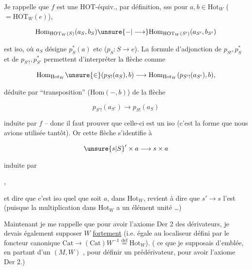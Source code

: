 Je rappelle que $f$ est une $\mathrm{HOT}$-équiv., par définition, sss pour  $a,b\in\mathrm{Hot}_W$ ($=\mathrm{HOT}_W(e)$),

\[
 \mathrm{Hom}_{\mathrm{HOT}_W(S)}(a_S,b_S)\unsure{\mathord{-}|\longrightarrow}
 \mathrm{Hom}_{\mathrm{HOT}_W(S')}(a_{S'},b_{S'})
\]

est iso, où $a_S$  désigne $p_S^*(a)$ etc ($p_S:S\longrightarrow e$). La formule d'adjonction de $p_{S!},p_S^*$ et de $p_{S'!},p_{S'}^*$ permettent d'interpréter la flèche  comme

\[
 \mathrm{Hom}_{\mathrm{Hot}_W}\unsure{\in}(p_{S!}(a_S),b)\longrightarrow
 \mathrm{Hom}_{\mathrm{Hot}_W}(p_{S'!}(a_{S'}),b),
\]


déduite par ``transposition'' ($\mathrm{Hom}(-,b)$) de la flèche

\[
 p_{S'!}(a_{S'})\longrightarrow p_{S!}(a_S)
\]

induite par $f$ -- donc il faut prouver que celle-ci est un iso (c'est la forme que nous avions utilisée tantôt). Or cette flèche s'identifie à

\[
 \unsure{s|S}'\times a\longrightarrow s\times a
\]

induite par


,

et dire que c'est iso quel que soit $a$, dans $\mathrm{Hot}_W$, revient à dire que $s'\longrightarrow s$ l'est (puisque la multiplication dans $\mathrm{Hot}_W$ a un élément unité \ldots)

Maintenant je me rappelle que pour avoir l'axiome Der 2 des dérivateurs, je devais également supposer $W$ \uline{fortement}  (i.e. égale au localiseur défini par le foncteur canonique $\mathrm{Cat}\longrightarrow(\mathrm{Cat})W^{-1}\overset{\mathrm{def}}{=}\mathrm{Hot}_W$). ( ce que je supposais d'emblée, en partant d'un $(M,W)$ , pour définir un prédérivateur, pour avoir l'axiome Der 2.)

